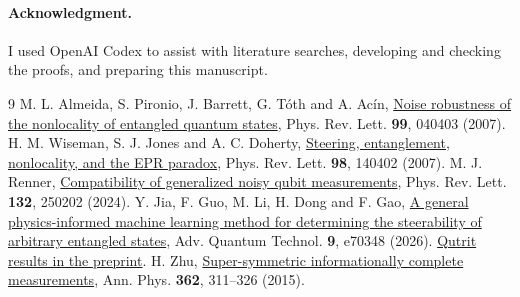 \documentclass[10pt,a4paper]{article}
\begin{document}
\paragraph{Acknowledgment.} I used OpenAI Codex to assist with literature searches, developing and checking the proofs, and preparing this manuscript.
\small
\begin{thebibliography}{9}
 M. L. Almeida, S. Pironio, J. Barrett, G. T\'oth and A. Ac\'in, \href{https://arxiv.org/abs/quant-ph/0703018}{Noise robustness of the nonlocality of entangled quantum states}, Phys. Rev. Lett. \textbf{99}, 040403 (2007).
 H. M. Wiseman, S. J. Jones and A. C. Doherty, \href{https://arxiv.org/abs/quant-ph/0612147}{Steering, entanglement, nonlocality, and the EPR paradox}, Phys. Rev. Lett. \textbf{98}, 140402 (2007).
 M. J. Renner, \href{https://arxiv.org/abs/2309.12290}{Compatibility of generalized noisy qubit measurements}, Phys. Rev. Lett. \textbf{132}, 250202 (2024).
 Y. Jia, F. Guo, M. Li, H. Dong and F. Gao, \href{https://doi.org/10.1002/qute.70348}{A general physics-informed machine learning method for determining the steerability of arbitrary entangled states}, Adv. Quantum Technol. \textbf{9}, e70348 (2026). \href{https://arxiv.org/html/2512.21848v2#S5.SS2}{Qutrit results in the preprint}.
 H. Zhu, \href{https://arxiv.org/abs/1412.1099}{Super-symmetric informationally complete measurements}, Ann. Phys. \textbf{362}, 311--326 (2015).
\end{thebibliography}
\end{document}
